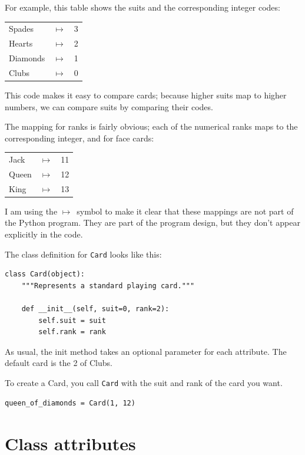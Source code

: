 \documentclass[10pt]{book}
\begin{document}
\begin{CJK}{UTF8}{gbsn}
\newcommand{\mymapsto}{$\mapsto$}

For example, this table shows the suits and the corresponding integer
codes:

\begin{tabular}{l c l}
Spades & \mymapsto & 3 \\
Hearts & \mymapsto & 2 \\
Diamonds & \mymapsto & 1 \\
Clubs & \mymapsto & 0
\end{tabular}

This code makes it easy to compare cards; because higher suits map to
higher numbers, we can compare suits by comparing their codes.

The mapping for ranks is fairly obvious; each of the numerical ranks
maps to the corresponding integer, and for face cards:

\begin{tabular}{l c l}
Jack & \mymapsto & 11 \\
Queen & \mymapsto & 12 \\
King & \mymapsto & 13 \\
\end{tabular}

I am using the \mymapsto~symbol to make it clear that these mappings
are not part of the Python program.  They are part of the program
design, but they don't appear explicitly in the code.

The class definition for {\tt Card} looks like this:

\begin{verbatim}
class Card(object):
    """Represents a standard playing card."""

    def __init__(self, suit=0, rank=2):
        self.suit = suit
        self.rank = rank
\end{verbatim}
%
As usual, the init method takes an optional
parameter for each attribute.  The default card is
the 2 of Clubs.

To create a Card, you call {\tt Card} with the
suit and rank of the card you want.

\begin{verbatim}
queen_of_diamonds = Card(1, 12)
\end{verbatim}
%


\section{Class attributes}
\label{class.attribute}


\end{CJK}
\end{document}
